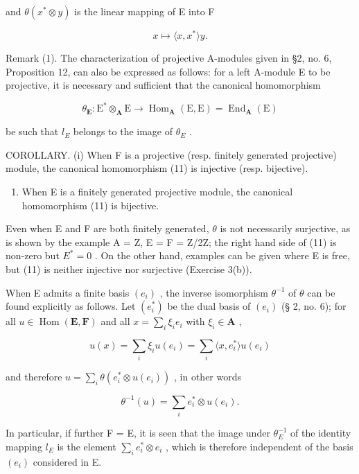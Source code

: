 and \(\theta (x^{*}\otimes y)\) is the linear mapping of E into F

\[
x \mapsto \langle x, x ^ {*} \rangle y.
\]

Remark (1). The characterization of projective A-modules given in §2, no. 6, Proposition 12, can also be expressed as follows: for a left A-module E to be projective, it is necessary and sufficient that the canonical homomorphism

\[
\theta_ {\mathbf {E}}: \mathrm{E} ^ {*} \otimes_ {\mathbf {A}} \mathrm{E} \rightarrow \operatorname{Hom} _ {\mathbf {A}} (\mathrm{E}, \mathrm{E}) = \operatorname{End} _ {\mathbf {A}} (\mathrm{E})
\]

be such that \(l_{E}\) belongs to the image of \(\theta_{E}\) .

COROLLARY. (i) When F is a projective (resp. finitely generated projective) module, the canonical homomorphism (11) is injective (resp. bijective).

\begin{enumerate}
\def\labelenumi{(\roman{enumi})}
\setcounter{enumi}{1}
\tightlist
\item
  When E is a finitely generated projective module, the canonical homomorphism (11) is bijective.
\end{enumerate}

Even when E and F are both finitely generated, \(\theta\) is not necessarily surjective, as is shown by the example A = Z, E = F = Z/2Z; the right hand side of (11) is non-zero but \(E^{*} = 0\) . On the other hand, examples can be given where E is free, but (11) is neither injective nor surjective (Exercise 3(b)).

When E admits a finite basis \((e_i)\) , the inverse isomorphism \(\theta^{-1}\) of \(\theta\) can be found explicitly as follows. Let \((e_i^*)\) be the dual basis of \((e_i)\) (§ 2, no. 6); for all \(u \in \operatorname{Hom}(\mathbf{E}, \mathbf{F})\) and all \(x = \sum_{i} \xi_i e_i\) with \(\xi_i \in \mathbf{A}\) ,

\[
u (x) = \sum_ {i} \xi_ {i} u (e _ {i}) = \sum_ {i} \langle x, e _ {i} ^ {*} \rangle u (e _ {i})
\]

and therefore \(u = \sum_{i} \theta(e_i^* \otimes u(e_i))\) , in other words

\[
\theta^ {- 1} (u) = \sum_ {i} e _ {i} ^ {*} \otimes u (e _ {i}).\tag{12}
\]

In particular, if further F = E, it is seen that the image under \(\theta_{E}^{-1}\) of the identity mapping \(l_{E}\) is the element \(\sum_{i} e_{i}^{*} \otimes e_{i}\) , which is therefore independent of the basis \((e_{i})\) considered in E.

